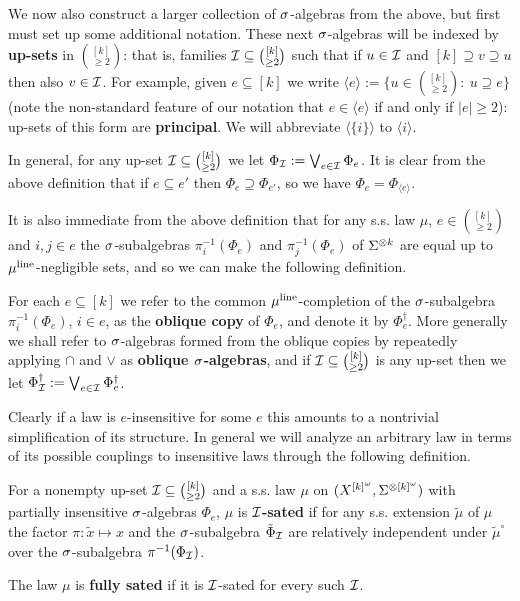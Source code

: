 \documentclass[11pt]{article}
\begin{document}
We now also construct a larger collection of $\s$-algebras from the
above, but first must set up some additional notation. These next
$\s$-algebras will be indexed by \textbf{up-sets} in
$\binom{[k]}{\geq 2}$: that is, families $\I\subseteq
\binom{[k]}{\geq 2}$ such that if $u \in \I$ and $[k]\supseteq
v\supseteq u$ then also $v \in \I$. For example, given $e \subseteq
[k]$ we write $\langle e\rangle := \{u \in\binom{[k]}{\geq 2}:\
u\supseteq e\}$ (note the non-standard feature of our notation that
$e \in \langle e\rangle$ if and only if $|e| \geq 2$): up-sets of
this form are \textbf{principal}.  We will abbreviate
$\langle\{i\}\rangle$ to $\langle i\rangle$.

In general, for any up-set $\I\subseteq \binom{[k]}{\geq 2}$ we let
$\Phi_\I:= \bigvee_{e \in \I}\Phi_e$.  It is clear from the above
definition that if $e \subseteq e'$ then $\Phi_e \supseteq
\Phi_{e'}$, so we have $\Phi_e = \Phi_{\langle e\rangle}$.

It is also immediate from the above definition that for any s.s. law
$\mu$, $e \in \binom{[k]}{\geq 2}$ and $i,j\in e$ the
$\s$-subalgebras $\pi_i^{-1}(\Phi_e)$ and $\pi_j^{-1}(\Phi_e)$ of
$\S^{\otimes k}$ are equal up to $\mu^\line$-negligible sets, and so
we can make the following definition.

\begin{dfn}
For each $e \subseteq [k]$ we refer to the common
$\mu^\line$-completion of the $\s$-subalgebra $\pi_i^{-1}(\Phi_e)$,
$i \in e$, as the \textbf{oblique copy} of $\Phi_e$, and denote it
by $\Phi^\dag_e$.  More generally we shall refer to $\s$-algebras
formed from the oblique copies by repeatedly applying $\cap$ and $\vee$ as \textbf{oblique $\s$-algebras}, and if $\I \subseteq \binom{[k]}{\geq 2}$ is any up-set then we let $\Phi^\dag_\I := \bigvee_{e \in \I}\Phi^\dag_e$.
\end{dfn}

Clearly if a law is $e$-insensitive for some $e$ this amounts to a
nontrivial simplification of its structure.  In general we will
analyze an arbitrary law in terms of its possible couplings to
insensitive laws through the following definition.

\begin{dfn}
For a nonempty up-set $\I \subseteq \binom{[k]}{\geq 2}$ and a s.s.
law $\mu$ on $(X^{[k]^\o},\S^{\otimes [k]^\o})$ with partially
insensitive $\s$-algebras $\Phi_e$, $\mu$ is \textbf{$\I$-sated} if
for any s.s. extension $\tilde{\mu}$ of $\mu$ the factor
$\pi:\tilde{x} \mapsto x$ and the $\s$-subalgebra $\tilde{\Phi}_\I$
are relatively independent under $\tilde{\mu}^\circ$ over the
$\s$-subalgebra $\pi^{-1}(\Phi_\I)$.

The law $\mu$ is \textbf{fully sated} if it is $\I$-sated for every
such $\I$.
\end{dfn}
\end{document}
